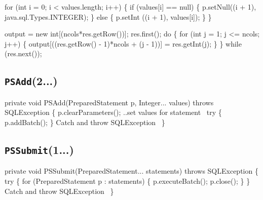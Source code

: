 \documentclass{article}
\def\nwendcode{\endtrivlist \endgroup}      %
\let\nwdocspar=\par
\theoremstyle{definition}                   %
\begin{document}
for (int i = 0; i < values.length; i++) \{
  if (values[i] == null) \{
    p.setNull((i + 1), java.sql.Types.INTEGER);
  \} else \{
    p.setInt ((i + 1), values[i]);
  \}
\}
\nwendcode{}\nwdocspar
\nwenddocs{}\endmoddef{}
output = new int[(ncols*res.getRow())];
res.first();
do \{
  for (int j = 1; j <= ncols; j++) \{
    output[((res.getRow() - 1)*ncols + (j - 1))] = res.getInt(j);
  \}
\} while (res.next());
\nwendcode{}\nwdocspar

\subsection{{\tt{}\protect{}PSAdd}(2...)}
\nwenddocs{}\endmoddef{}
private void PSAdd(PreparedStatement p, Integer... values) throws SQLException \{
  p.clearParameters();
  \LA{}..set values for statement~{\nwtagstyle{}}\RA{}
  try \{
    p.addBatch();
  \}
  \LA{}Catch and throw \code{}SQLException\edoc{}~{\nwtagstyle{}}\RA{}
\}
\eatline
{}\nwendcode{}\nwdocspar
\subsection{{\tt{}\protect{}PSSubmit}(1...)}
\nwenddocs{}\endmoddef{}
private void PSSubmit(PreparedStatement... statements) throws SQLException \{
  try \{
    for (PreparedStatement p : statements) \{
      p.executeBatch();
      p.close();
    \}
  \}
  \LA{}Catch and throw \code{}SQLException\edoc{}~{\nwtagstyle{}}\RA{}
\}
\eatline
{}\nwendcode{}\nwdocspar
\end{document}
